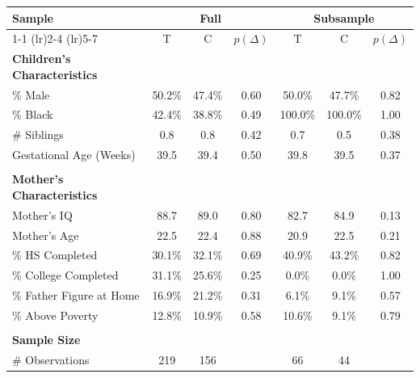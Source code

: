 \begin{tabular}{lcccccc}
\toprule 
\midrule 
Sample & \multicolumn{3}{c}{Full} & \multicolumn{3}{c}{Subsample} \\
 \cmidrule(lr){1-1} \cmidrule(lr){2-4} \cmidrule(lr){5-7} 
 & T & C & $p(\Delta)$ & T & C & $p(\Delta)$ \\
\midrule 
\textbf{Children's Characteristics} \\
\quad \% Male & 50.2\% & 47.4\% & 0.60 & 50.0\% & 47.7\% & 0.82 \\
\quad \% Black & 42.4\% & 38.8\% & 0.49 & 100.0\% & 100.0\% & 1.00 \\
\quad \# Siblings & 0.8 & 0.8 & 0.42 & 0.7 & 0.5 & 0.38 \\
\quad Gestational Age (Weeks) & 39.5 & 39.4 & 0.50 & 39.8 & 39.5 & 0.37 \\
 \\
\textbf{Mother's Characteristics} \\
\quad Mother's IQ & 88.7 & 89.0 & 0.80 & 82.7 & 84.9 & 0.13 \\
\quad Mother's Age & 22.5 & 22.4 & 0.88 & 20.9 & 22.5 & 0.21 \\
\quad \% HS Completed & 30.1\% & 32.1\% & 0.69 & 40.9\% & 43.2\% & 0.82 \\
\quad \% College Completed & 31.1\% & 25.6\% & 0.25 & 0.0\% & 0.0\% & 1.00 \\
\quad \% Father Figure at Home & 16.9\% & 21.2\% & 0.31 & 6.1\% & 9.1\% & 0.57 \\
\quad \% Above Poverty & 12.8\% & 10.9\% & 0.58 & 10.6\% & 9.1\% & 0.79 \\
 \\
\textbf{Sample Size} \\
\quad \# Observations & 219 & 156 &  & 66 & 44 &  \\
\midrule 
\bottomrule 
\end{tabular}
